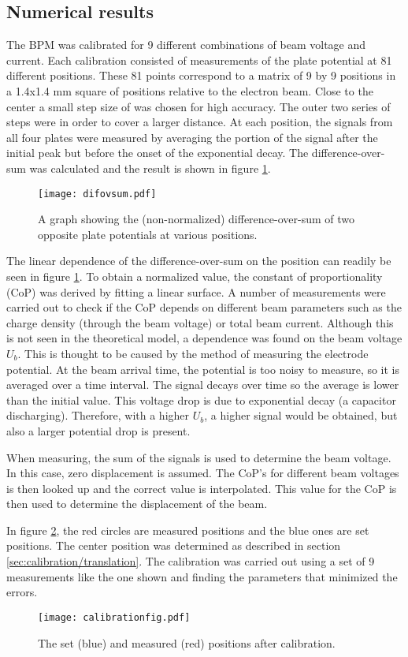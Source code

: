 \subsection{Numerical results}
The BPM was calibrated for 9 different combinations of beam voltage and current. Each calibration consisted of measurements of the plate potential at 81 different positions. These 81 points correspond to a matrix of 9 by 9 positions in a 1.4x1.4 mm square of positions relative to the electron beam. Close to the center a small step size of  was chosen for high accuracy. The outer two series of steps were  in order to cover a larger distance.
At each position, the signals from all four plates were measured by averaging the portion of the signal after the initial peak but before the onset of the exponential decay. The difference-over-sum was calculated and the result is shown in figure \ref{fig:difovsum}.
\begin{figure}[h]
 \centering
 \texttt{[image: difovsum.pdf]}
 \caption{A graph showing the (non-normalized) difference-over-sum of two opposite plate potentials at various positions.}
 \label{fig:difovsum}
\end{figure}

The linear dependence of the difference-over-sum on the position can readily be seen in figure \ref{fig:difovsum}. To obtain a normalized value, the constant of proportionality (CoP) was derived by fitting a linear surface.
A number of measurements were carried out to check if the CoP depends on different beam parameters such as the charge density (through the beam voltage) or total beam current. Although this is not seen in the theoretical model, a dependence was found on the beam voltage $U_b$.
This is thought to be caused by the method of measuring the electrode potential. At the beam arrival time, the potential is too noisy to measure, so it is averaged over a time interval. The signal decays over time so the average is lower than the initial value. This voltage drop is due to exponential decay (a capacitor discharging). Therefore, with a higher $U_b$, a higher signal would be obtained, but also a larger potential drop is present. 

When measuring, the sum of the signals is used to determine the beam voltage. In this case, zero displacement is assumed. The CoP's for different beam voltages is then looked up and the correct value is interpolated. This value for the CoP is then used to determine the displacement of the beam.

In figure \ref{fig:calfig}, the red circles are measured positions and the blue ones are set positions. The center position was determined as described in section \ref{sec:calibration/translation}. The calibration was carried out using a set of 9 measurements like the one shown and finding the parameters that minimized the errors.

\begin{figure}[H]
\centering
\texttt{[image: calibrationfig.pdf]}
\caption{The set (blue) and measured (red) positions after calibration.}
\label{fig:calfig}
\end{figure}
